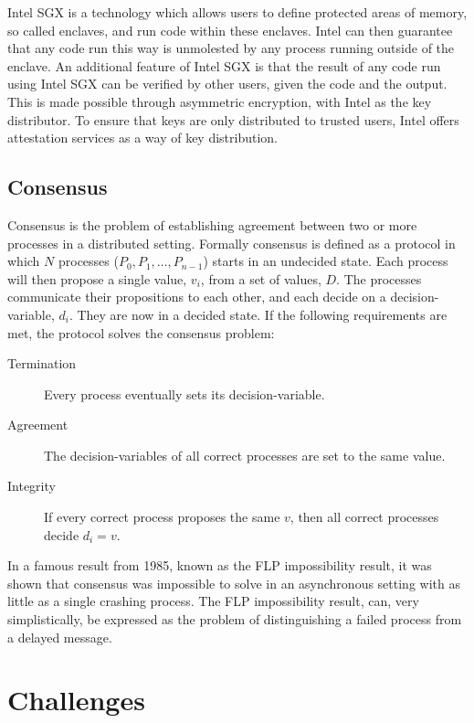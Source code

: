 \documentclass{article}
\begin{document}
		Intel SGX is a technology which allows users to define protected areas of memory, so called enclaves, and run code within these enclaves.
		Intel can then guarantee that any code run this way is unmolested by any process running outside of the enclave.
		An additional feature of Intel SGX is that the result of any code run using Intel SGX can be verified by other users, given the code and the output.
		This is made possible through asymmetric encryption, with Intel as the key distributor.
		To ensure that keys are only distributed to trusted users, Intel offers attestation services as a way of key distribution.

		\subsection{Consensus}
		Consensus is the problem of establishing agreement between two or more processes in a distributed setting. Formally consensus is defined as a protocol in which $N$ processes ($P_0, P_1, \dots, P_{n-1}$) starts in an undecided state. Each process will then propose a single value, $v_i$, from a set of values, $D$. The processes communicate their propositions to each other, and each decide on a decision-variable, $d_i$. They are now in a decided state. If the following requirements are met, the protocol solves the consensus problem:
		\begin{description}
			\item[Termination] Every process eventually sets its decision-variable. 
			\item[Agreement] The decision-variables of all correct processes are set to the same value.
			\item[Integrity] If every correct process proposes the same $v$, then all correct processes decide $d_i = v$.
		\end{description}

		In a famous result from 1985, known as the FLP impossibility result\cite{flp}, it was shown that consensus was impossible to solve in an asynchronous setting with as little as a single crashing process. The FLP impossibility result, can, very simplistically, be expressed as the problem of distinguishing a failed process from a delayed message.\\

	\section{Challenges}
\end{document}
